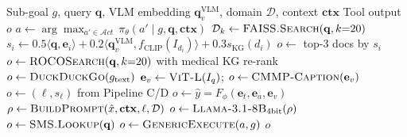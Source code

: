 \documentclass[10pt,conference]{IEEEtran}
\theoremstyle{ieeethm}
\theoremstyle{ieeedef}
\theoremstyle{ieeeremark}
\begin{document}
\begin{algorithm}[!t]
\caption{TUO: Tool-Selection and Execution}
\label{alg:tuo}
\begin{algorithmic}[1]
\small
\Require Sub-goal $g$, query $\mathbf{q}$, VLM embedding $\mathbf{q}_v^\text{VLM}$, domain $\mathcal{D}$, context $\mathbf{ctx}$
\Ensure Tool output $o$
\State $a \leftarrow \arg\max_{a' \in \mathcal{A}ct}\, \pi_\theta(a' \mid g, \mathbf{q}, \mathbf{ctx})$
  \State $\mathcal{D}_k \leftarrow \textsc{FAISS.Search}(\mathbf{q}, k{=}20)$
    \State $s_i \leftarrow 0.5\langle\mathbf{q},\mathbf{e}_i\rangle + 0.2\langle\mathbf{q}_v^\text{VLM},f_\text{CLIP}(I_{d_i})\rangle + 0.3 s_\text{KG}(d_i)$
  \EndFor
  \State $o \leftarrow$ top-3 docs by $s_i$
  \State $o \leftarrow \textsc{ROCOSearch}(\mathbf{q}, k{=}20)$ with medical KG re-rank
  \State $o \leftarrow \textsc{DuckDuckGo}(g_\text{text})$ 
  \State $\mathbf{e}_v \leftarrow \textsc{ViT\text{-}L}(I_q)$;\; $o \leftarrow \textsc{CMMP\text{-}Caption}(\mathbf{e}_v)$
  \State $o \leftarrow (\ell, s_\ell)$ from Pipeline C/D
  \State $o \leftarrow \hat{y} = F_\phi(\mathbf{e}_t, \mathbf{e}_a, \mathbf{e}_v)$ 
  \State $\rho \leftarrow \textsc{BuildPrompt}(\hat{x}, \mathbf{ctx}, \ell, \mathcal{D})$
  \State $o \leftarrow \textsc{Llama\text{-}3.1\text{-}8B}_\text{4bit}(\rho)$
  \State $o \leftarrow \textsc{SMS.Lookup}(\mathbf{q})$
\Else
  \State $o \leftarrow \textsc{GenericExecute}(a, g)$
\EndIf
\State \Return $o$
\end{algorithmic}
\end{algorithm}
\end{document}
